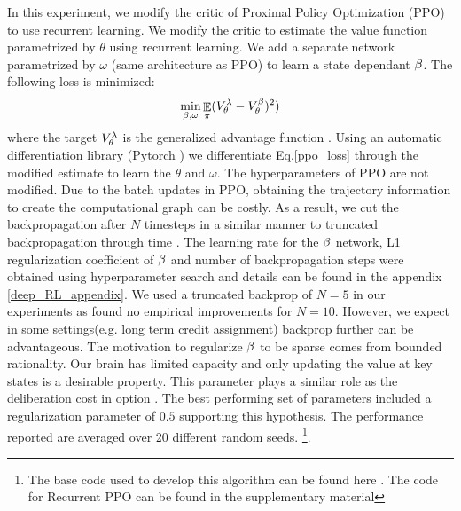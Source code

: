 In this experiment, we modify the critic of Proximal Policy Optimization (PPO)~\cite{schulman2017proximal} to use recurrent learning. We modify the critic to estimate the value function parametrized by $\theta$ using recurrent learning. We add a separate network parametrized by $\omega$ (same architecture as PPO) to learn a state dependant $\beta$. The following loss is minimized:
\begin{equation}\label{ppo_loss}
    \min_{\beta,\omega} \mathop{\mathbb{E}}_{\pi}(V_{\theta}^{\lambda}-V^{\beta}_{\theta})^2)
\end{equation}
where the target $V_{\theta}^{\lambda}$ is the generalized advantage function \cite{schulman2015high}. Using an automatic differentiation library (Pytorch \cite{paszke2017automatic}) we differentiate Eq.\ref{ppo_loss} through the modified estimate to learn the $\theta$ and $\omega$. The hyperparameters of PPO are not modified. Due to the batch updates in PPO, obtaining the trajectory information to create the computational graph can be costly. As a result, we cut the backpropagation after $N$ timesteps in a similar manner to truncated backpropagation through time \cite{williams1995gradient}. The learning rate for the $\beta$ network, L1 regularization coefficient of $\beta$ and number of backpropagation steps were obtained using hyperparameter search and details can be found in the appendix \ref{deep_RL_appendix}. We used a truncated backprop of $N=5$ in our experiments as found no empirical improvements for $N=10$. However, we expect in some settings(e.g. long term credit assignment) backprop further can be advantageous. The motivation to regularize $\beta$ to be sparse comes from bounded rationality. Our brain has limited capacity and only updating the value at key states is a desirable property. This parameter plays a similar role as the deliberation cost in option \cite{harb2018waiting}. The best performing set of parameters included a regularization parameter of $0.5$ supporting this hypothesis. The performance reported are averaged over 20 different random seeds. \footnote{The base code used to develop this algorithm can be found here \cite{pytorchrl}. The code for Recurrent PPO can be found in the supplementary material}.

 
